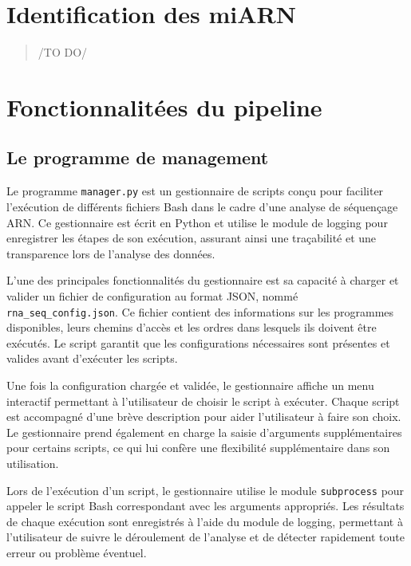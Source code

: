 \section{Identification des miARN}


\begin{quote}
    /TO DO/
\end{quote}


\section{Fonctionnalitées du pipeline}
\subsection{Le programme de management}

Le programme \texttt{manager.py} est un gestionnaire de scripts conçu pour faciliter l'exécution de différents fichiers Bash dans le cadre d'une analyse de séquençage ARN. Ce gestionnaire est écrit en Python et utilise le module de logging pour enregistrer les étapes de son exécution, assurant ainsi une traçabilité et une transparence lors de l'analyse des données.\newline

L'une des principales fonctionnalités du gestionnaire est sa capacité à charger et valider un fichier de configuration au format JSON, nommé \texttt{rna\_seq\_config.json}. Ce fichier contient des informations sur les programmes disponibles, leurs chemins d'accès et les ordres dans lesquels ils doivent être exécutés. Le script garantit que les configurations nécessaires sont présentes et valides avant d'exécuter les scripts.\newline

Une fois la configuration chargée et validée, le gestionnaire affiche un menu interactif permettant à l'utilisateur de choisir le script à exécuter. Chaque script est accompagné d'une brève description pour aider l'utilisateur à faire son choix. Le gestionnaire prend également en charge la saisie d'arguments supplémentaires pour certains scripts, ce qui lui confère une flexibilité supplémentaire dans son utilisation.\newline

Lors de l'exécution d'un script, le gestionnaire utilise le module \texttt{subprocess} pour appeler le script Bash correspondant avec les arguments appropriés. Les résultats de chaque exécution sont enregistrés à l'aide du module de logging, permettant à l'utilisateur de suivre le déroulement de l'analyse et de détecter rapidement toute erreur ou problème éventuel.\newline

